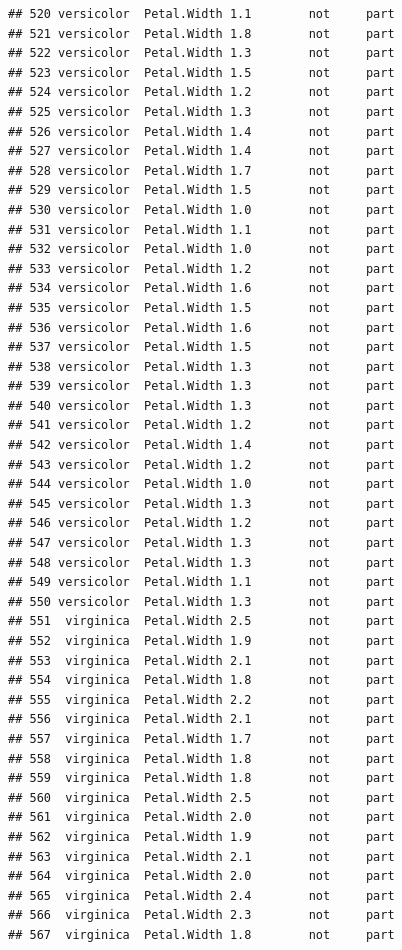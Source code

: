 \documentclass[krantz2]{krantz}\usepackage{knitr}%
\begin{document}
\begin{knitrout}
\begin{kframe}
\begin{verbatim}
## 520 versicolor  Petal.Width 1.1        not     part
## 521 versicolor  Petal.Width 1.8        not     part
## 522 versicolor  Petal.Width 1.3        not     part
## 523 versicolor  Petal.Width 1.5        not     part
## 524 versicolor  Petal.Width 1.2        not     part
## 525 versicolor  Petal.Width 1.3        not     part
## 526 versicolor  Petal.Width 1.4        not     part
## 527 versicolor  Petal.Width 1.4        not     part
## 528 versicolor  Petal.Width 1.7        not     part
## 529 versicolor  Petal.Width 1.5        not     part
## 530 versicolor  Petal.Width 1.0        not     part
## 531 versicolor  Petal.Width 1.1        not     part
## 532 versicolor  Petal.Width 1.0        not     part
## 533 versicolor  Petal.Width 1.2        not     part
## 534 versicolor  Petal.Width 1.6        not     part
## 535 versicolor  Petal.Width 1.5        not     part
## 536 versicolor  Petal.Width 1.6        not     part
## 537 versicolor  Petal.Width 1.5        not     part
## 538 versicolor  Petal.Width 1.3        not     part
## 539 versicolor  Petal.Width 1.3        not     part
## 540 versicolor  Petal.Width 1.3        not     part
## 541 versicolor  Petal.Width 1.2        not     part
## 542 versicolor  Petal.Width 1.4        not     part
## 543 versicolor  Petal.Width 1.2        not     part
## 544 versicolor  Petal.Width 1.0        not     part
## 545 versicolor  Petal.Width 1.3        not     part
## 546 versicolor  Petal.Width 1.2        not     part
## 547 versicolor  Petal.Width 1.3        not     part
## 548 versicolor  Petal.Width 1.3        not     part
## 549 versicolor  Petal.Width 1.1        not     part
## 550 versicolor  Petal.Width 1.3        not     part
## 551  virginica  Petal.Width 2.5        not     part
## 552  virginica  Petal.Width 1.9        not     part
## 553  virginica  Petal.Width 2.1        not     part
## 554  virginica  Petal.Width 1.8        not     part
## 555  virginica  Petal.Width 2.2        not     part
## 556  virginica  Petal.Width 2.1        not     part
## 557  virginica  Petal.Width 1.7        not     part
## 558  virginica  Petal.Width 1.8        not     part
## 559  virginica  Petal.Width 1.8        not     part
## 560  virginica  Petal.Width 2.5        not     part
## 561  virginica  Petal.Width 2.0        not     part
## 562  virginica  Petal.Width 1.9        not     part
## 563  virginica  Petal.Width 2.1        not     part
## 564  virginica  Petal.Width 2.0        not     part
## 565  virginica  Petal.Width 2.4        not     part
## 566  virginica  Petal.Width 2.3        not     part
## 567  virginica  Petal.Width 1.8        not     part

\end{verbatim}
\end{kframe}
\end{knitrout}
\end{document}
